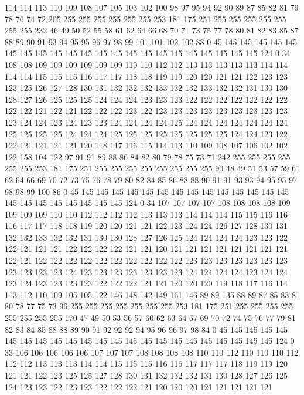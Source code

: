 114 114 113 110 109 108 107 105 103 102 100 98 97 95 94 92 90 89 87 85
82 81 79 78 76 74 72 205 255 255 255 255 255 255 253 181 175 251 255 255
255 255 255 255 255 232 46 49 50 52 55 58 61 62 64 66 68 70 71 73
75 77 78 80 81 82 83 85 87 88 89 90 91 93 94 95 95 96 97 98
99 101 101 102 102 88 0 45 145 145 145 145 145 145 145 145 145 145 145 145
145 145 145 145 145 145 145 145 145 145 124 0 34 108 108 109 109 109 109 109
109 110 110 112 112 113 113 113 113 113 114 114 114 114 115 115 115 116 117 117
118 118 119 119 120 120 121 121 122 123 123 123 125 126 127 128 130 131 132 132
132 133 132 132 133 132 132 131 130 130 128 127 126 125 125 125 124 124 124 123
123 123 122 122 122 122 122 122 122 122 122 121 122 121 122 122 122 123 122 123
123 123 123 123 123 123 123 123 123 124 124 123 124 123 123 124 124 124 124 125
124 124 124 124 124 124 124 125 125 125 125 124 124 124 125 125 125 125 125 125
125 125 124 124 123 122 122 121 121 121 121 120 118 117 116 115 114 113 110 109
108 107 106 102 102 122 158 104 122 97 91 91 89 88 86 84 82 80 79 78
75 73 71 242 255 255 255 255 255 255 253 181 175 251 255 255 255 255 255 255
255 255 90 48 49 51 53 57 59 61 62 64 66 69 70 72 73 75 76 78
79 80 82 84 85 86 88 88 90 91 91 93 93 94 95 95 97 98 98 99
100 86 0 45 145 145 145 145 145 145 145 145 145 145 145 145 145 145 145 145
145 145 145 145 145 145 124 0 34 107 107 107 107 108 108 108 108 109 109 109
109 110 110 112 112 112 112 113 113 113 114 114 114 115 115 116 116 116 117 117
118 118 119 120 120 121 121 122 123 124 124 126 127 128 130 131 132 132 133 132
132 131 130 130 128 127 126 125 124 124 124 124 123 123 122 122 121 121 121 122
122 122 122 121 121 120 121 121 121 121 121 121 121 121 122 121 122 122 122 122
122 122 122 122 122 122 123 123 123 123 123 123 123 123 123 123 123 124 123 123
123 123 123 123 123 124 124 124 124 123 124 124 123 124 123 123 123 123 122 122
122 121 121 120 120 120 119 118 117 116 114 113 112 110 109 105 105 122 146 148
142 149 161 146 89 89 135 88 89 87 85 83 81 80 78 77 75 73 96 255
255 255 255 255 255 255 253 181 175 251 255 255 255 255 255 255 255 255 170 47
49 50 53 56 57 60 62 63 64 67 69 70 72 74 75 76 77 79 81 82
83 84 85 88 88 89 90 91 92 92 92 94 95 96 96 97 98 84 0 45
145 145 145 145 145 145 145 145 145 145 145 145 145 145 145 145 145 145 145 145
145 145 124 0 33 106 106 106 106 106 107 107 107 108 108 108 108 110 110 112
110 110 110 112 112 112 113 113 113 114 114 115 115 115 116 116 117 117 117 118
119 119 120 121 121 122 123 125 125 127 128 130 131 132 132 132 131 130 128 127
126 125 124 123 123 122 123 123 122 122 122 121 120 120 120 121 121 121 121 121
